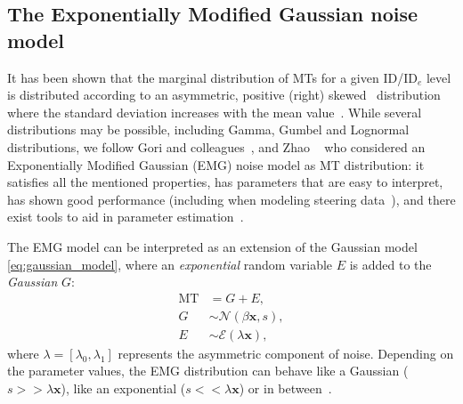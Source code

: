 \documentclass[12pt,a4paper]{article}
\newcommand{\ide}{\ensuremath{{\text{ID}_e}}\xspace}
\begin{document}





\subsection{The Exponentially Modified Gaussian noise model}
It has been shown that the marginal distribution of MTs for a given ID/\ide level is distributed according to an asymmetric, positive (right) skewed~\cite{gori2018these,gori2019,zhao2022, jude2016,nieuwenhuizen2016, li2024,chapuis2007} distribution where the standard deviation increases with the mean value~\cite{wagenmakers2007, gori2018these, zhao2022}.
While several distributions may be possible, including Gamma, Gumbel and Lognormal distributions, we follow Gori and colleagues~\cite{gori2018these,gori2019, li2014}, and Zhao \etal~\cite{zhao2022} who considered an Exponentially Modified Gaussian (EMG) noise model as MT distribution: it satisfies all the mentioned properties, has parameters that are easy to interpret, has shown good performance (including when modeling steering data~\cite{wang2021}), and there exist tools to aid in parameter estimation~\cite{li2024,emgregs}.

The EMG model can be interpreted as an extension of the Gaussian model \autoref{eq:gaussian_model}, where an \textit{exponential} random variable $E$ is added to the \textit{Gaussian} $G$:
\begin{align}
	\text{MT} & = G + E, \label{eq:emg}                \\
	G         & \sim \mathcal{N}(\beta \mathbf{x}, s), \\
	E         & \sim \mathcal{E}(\lambda \mathbf{x}),
\end{align}
where $\lambda = [\lambda_0, \lambda_1]$ represents the asymmetric component of noise.
Depending on the parameter values, the EMG distribution can behave like a Gaussian ($s >> \lambda \mathbf{x}$), like an exponential ($s << \lambda \mathbf{x}$) or in between~\cite{gori2019}.
\end{document}
